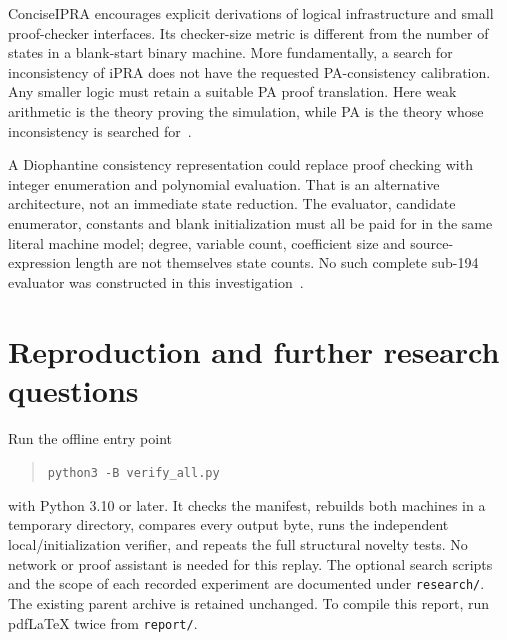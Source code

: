 \documentclass[11pt,letterpaper]{article}
\newcommand{\file}[1]{\texttt{\nolinkurl{#1}}}
\begin{document}
ConciseIPRA encourages explicit derivations of logical infrastructure and
small proof-checker interfaces. Its checker-size metric is different from
the number of states in a blank-start binary machine. More fundamentally,
a search for inconsistency of iPRA does not have the requested PA-consistency
calibration. Any smaller logic must retain a suitable PA proof translation.
Here weak arithmetic is the theory proving the simulation, while PA is the
theory whose inconsistency is searched for~\cite{concise}.

A Diophantine consistency representation could replace proof checking with
integer enumeration and polynomial evaluation. That is an alternative
architecture, not an immediate state reduction. The evaluator, candidate
enumerator, constants and blank initialization must all be paid for in the
same literal machine model; degree, variable count, coefficient size and
source-expression length are not themselves state counts. No such complete
sub-194 evaluator was constructed in this investigation~\cite{dioph}.

\section{Reproduction and further research questions}
Run the offline entry point
\begin{quote}\verb|python3 -B verify_all.py|\end{quote}
with Python 3.10 or later. It checks the manifest, rebuilds both machines in
a temporary directory, compares every output byte, runs the independent
local/initialization verifier, and repeats the full structural novelty tests.
No network or proof assistant is needed for this replay. The optional
search scripts and the scope of each recorded experiment are documented
under \file{research/}. The existing parent archive is retained unchanged.
To compile this report, run pdfLaTeX twice from \file{report/}.

\clearpage
\end{document}
